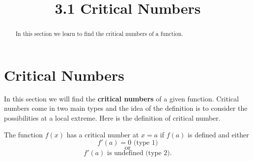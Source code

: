 \documentclass{ximera}
\title{3.1 Critical Numbers}
\begin{document}
\begin{abstract}
In this section we learn to find the critical numbers of a function.
\end{abstract}

\maketitle









\section{Critical Numbers}

In this section we will find the {\bf critical numbers} of a given function. 
Critical numbers come in two main types and the idea of the definition is to consider the possibilities at a local extreme. Here is the definition of  critical number.  \\

\begin{image}
\end{image}



\begin{definition}
The function $f(x)$ has a critical number at $x = a$ if $f(a)$ is defined and either
\[f'(a) = 0 \text{  (type 1)}\]
\[ \text{or} \]
\[f'(a)  \text{   is undefined  (type 2)}.\]
\end{definition}
\end{document}
